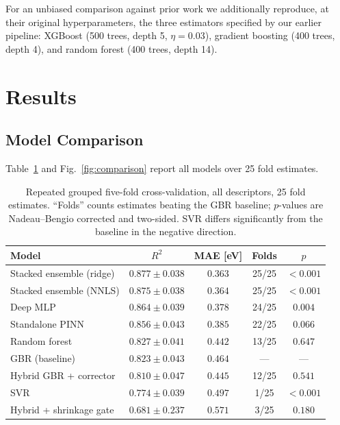 \documentclass{ieeeaccess}
\begin{document}
For an unbiased comparison against prior work we additionally reproduce, at their original hyperparameters, the three estimators specified by our earlier pipeline: XGBoost (500 trees, depth 5, $\eta=0.03$), gradient boosting (400 trees, depth 4), and random forest (400 trees, depth 14).

\section{Results}
\label{sec:results}

\subsection{Model Comparison}
Table~\ref{tab:benchmark} and Fig.~\ref{fig:comparison} report all models over 25 fold estimates.

\begin{table}[!t]
\caption{Repeated grouped five-fold cross-validation, all descriptors, 25 fold estimates. ``Folds'' counts estimates beating the GBR baseline; $p$-values are Nadeau--Bengio corrected and two-sided. SVR differs significantly from the baseline in the negative direction.\label{tab:benchmark}}
\centering
\begin{tabular}{lcccc}
\toprule
Model & $R^2$ & MAE [eV] & Folds & $p$ \\
\midrule
Stacked ensemble (ridge) & $\mathbf{0.877 \pm 0.038}$ & $\mathbf{0.363}$ & 25/25 & $<0.001$ \\
Stacked ensemble (NNLS)  & $0.875 \pm 0.038$ & $0.364$ & 25/25 & $<0.001$ \\
Deep MLP                 & $0.864 \pm 0.039$ & $0.378$ & 24/25 & $0.004$ \\
Standalone PINN          & $0.856 \pm 0.043$ & $0.385$ & 22/25 & $0.066$ \\
Random forest            & $0.827 \pm 0.041$ & $0.442$ & 13/25 & $0.647$ \\
GBR (baseline)           & $0.823 \pm 0.043$ & $0.464$ & ---   & ---    \\
Hybrid GBR + corrector   & $0.810 \pm 0.047$ & $0.445$ & 12/25 & $0.541$ \\
SVR                      & $0.774 \pm 0.039$ & $0.497$ &  1/25 & $<0.001$ \\
Hybrid + shrinkage gate  & $0.681 \pm 0.237$ & $0.571$ &  3/25 & $0.180$ \\
\bottomrule
\end{tabular}
\end{table}
\end{document}
